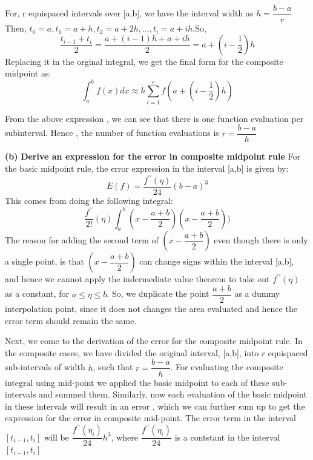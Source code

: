 \documentclass{article}
\renewcommand\part[1]{\vspace{.10in}\textbf{(#1)}}
\begin{document}
  For, r equispaced intervals over [a,b], we have the interval width as $h = \dfrac{b-a}{r}$
  Then, $t_0 = a, t_1 = a+h, t_2 = a+2h, \dots, t_i = a+ih$.So,
  \[\dfrac{t_{i-1} + t_i}{2} = \dfrac{a + (i-1)h + a+ih}{2} = a + (i - \dfrac{1}{2})h\]
  Replacing it in the orginal integral, we get the final form for the composite midpoint as:
  \[\int_{a}^{b} f(x)dx \approx h \sum_{i=1}^r  f(a + (i - \dfrac{1}{2})h)\]

  From the above expression , we can see that there is one function evaluation per subinterval. Hence , the number of function evaluations is $r = \dfrac{b-a}{h}$ \newline

  \part{b} \textbf {Derive an expression for the error in composite midpoint rule} \newline
  For the basic midpoint rule, the error expression in the interval [a,b] is given by:
  \[E(f) = \dfrac{f^{\prime\prime}(\eta)}{24}(b-a)^3\]
  This comes from doing the following integral:
  \[\dfrac{f^{\prime\prime}}{2!}(\eta)\int_{a}^{b}(x - \dfrac{a+b}{2})(x - \dfrac{a+b}{2})) \]
  The reason for adding the second term of $(x - \dfrac{a+b}{2})$ even though there is only a single point, is that $(x - \dfrac{a+b}{2})$ can change signs within the interval [a,b], and hence we cannot apply the indermediate value theorem to take out $f^{\prime\prime}(\eta)$ as a constant, for $a \leq \eta \leq b$. So, we duplicate the point $\dfrac{a+b}{2}$ as a dummy interpolation point, since it does not changes the area evaluated and hence the error term should remain the same. \newline

  Next, we come to the derivation of the error for the composite midpoint rule. In the composite cases, we have divided the original interval, [a,b], into $r$ equispaced sub-intervals of width $h$, such that $r = \dfrac{b-a}{h}$. For evaluating the composite integral using mid-point we applied the basic midpoint to each of these sub-intervals and summed them. Similarly, now each evaluation of the basic midpoint in these intervals will result in an error , which we can further sum up to get the expression for the error in composite mid-point. The error term in the interval $[t_{i-1},t_i]$ will be $\dfrac{f^{\prime\prime}(\eta_i)}{24}h^3$, where $\dfrac{f^{\prime\prime}(\eta_i)}{24}$ is a contstant in the interval $[t_{i-1},t_i]$
  
\end{document}
